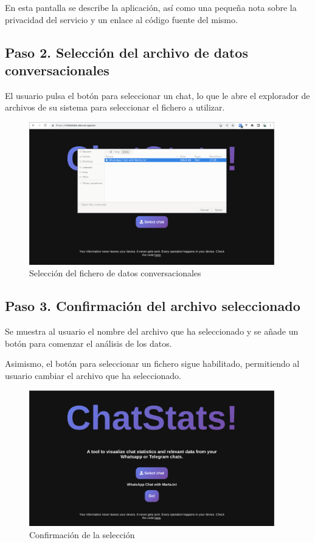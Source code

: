 En esta pantalla se describe la aplicación, así como una pequeña nota sobre la privacidad del servicio y un enlace al código fuente del mismo.


\subsection{Paso 2. Selección del archivo de datos conversacionales}

El usuario pulsa el botón para seleccionar un chat, lo que le abre el explorador de archivos de su sistema para seleccionar el fichero a utilizar.

\begin{figure}[H]
	\centering
	\includegraphics[width=0.95\textwidth]{img/study_case/step2.png}
	\caption{Selección del fichero de datos conversacionales}
	\label{fig:chap5:step_2}
\end{figure}


\subsection{Paso 3. Confirmación del archivo seleccionado}

Se muestra al usuario el nombre del archivo que ha seleccionado y se añade un botón para comenzar el análisis de los datos.

Asimismo, el botón para seleccionar un fichero sigue habilitado, permitiendo al usuario cambiar el archivo que ha seleccionado.

\begin{figure}[H]
	\centering
	\includegraphics[width=0.95\textwidth]{img/study_case/step3.png}
	\caption{Confirmación de la selección}
	\label{fig:chap5:step_3}
\end{figure}


